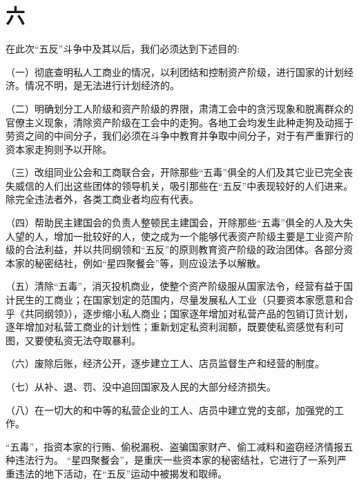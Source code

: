 \date{一九五二年三月二十三日}
\section*{六}

在此次“五反”斗争中及其以后，我们必须达到下述目的:

（一）彻底查明私人工商业的情况，以利团结和控制资产阶级，进行国家的计划经济。情况不明，是无法进行计划经济的。

（二）明确划分工人阶级和资产阶级的界限，肃清工会中的贪污现象和脱离群众的官僚主义现象，清除资产阶级在工会中的走狗。各地工会均发生此种走狗及动摇于劳资之间的中间分子，我们必须在斗争中教育并争取中间分子，对于有严重罪行的资本家走狗则予以开除。

（三）改组同业公会和工商联合会，开除那些“五毒”俱全的人们及其它业已完全丧失威信的人们出这些团体的领导机关，吸引那些在“五反”中表现较好的人们进来。除完全违法者外，各类工商业者均应有代表。

（四）帮助民主建国会的负责人整顿民主建国会，开除那些“五毒”俱全的人及大失人望的人，增加一批较好的人，使之成为一个能够代表资产阶级主要是工业资产阶级的合法利益，并以共同纲领和“五反”的原则教育资产阶级的政治团体。各部分资本家的秘密结社，例如“星四聚餐会”等，则应设法予以解散。

（五）清除“五毒”，消灭投机商业，使整个资产阶级服从国家法令，经营有益于国计民生的工商业；在国家划定的范围内，尽量发展私人工业（只要资本家愿意和合乎《共同纲领》），逐步缩小私人商业；国家逐年增加对私营产品的包销订货计划，逐年增加对私营工商业的计划性；重新划定私资利润额，既要使私资感觉有利可图，又要使私资无法夺取暴利。

（六）废除后账，经济公开，逐步建立工人、店员监督生产和经营的制度。

（七）从补、退、罚、没中追回国家及人民的大部分经济损失。

（八）在一切大的和中等的私营企业的工人、店员中建立党的支部，加强党的工作。


\begin{maonote}
“五毒”，指资本家的行贿、偷税漏税、盗骗国家财产、偷工减料和盗窃经济情报五种违法行为。
“星四聚餐会”，是重庆一些资本家的秘密结社，它进行了一系列严重违法的地下活动，在“五反”运动中被揭发和取缔。
\end{maonote}
